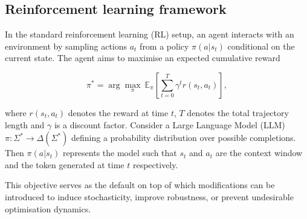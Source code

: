 

\subsection{Reinforcement learning framework}

In the standard reinforcement learning (RL) setup, an agent interacts with an environment by sampling actions $a_t$ from a policy $\pi(a|s_t)$ conditional on the current state. The agent aims to maximise an expected cumulative reward

\begin{equation}
    \pi^* = \arg \underset{\pi}{\max}\ \mathbb{E}_\pi
    \left[\sum^T_{t=0}\gamma^t r(s_t, a_t)\right],
\end{equation}

where $r(s_t, a_t)$ denotes the reward at time $t$, $T$ denotes the total trajectory length and $\gamma$ is a discount factor. Consider a Large Language Model (LLM) $\pi: \Sigma^* \to \Delta(\Sigma^*)$ defining a probability distribution over possible completions. Then $\pi(a|s_t)$ represents the model such that $s_t$ and $a_t$ are the context window and the token generated at time $t$ respectively.

This objective serves as the default on top of which modifications can be introduced to induce stochasticity, improve robustness, or prevent undesirable optimisation dynamics.


